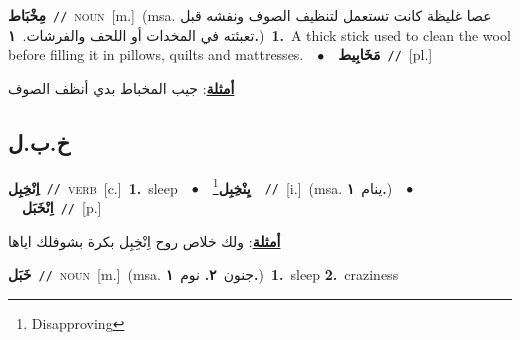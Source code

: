 \documentclass[10pt,a4paper,twoside]{article} %
\begin{document}
\begin{multicols}{2}
{{\setlength\topsep{0pt}\textbf{\foreignlanguage{arabic}{مِخْبَاط}}\ {\color{gray}\texttt{//}\color{black}}\ \textsc{noun}\ [m.]\ \color{gray}(msa. \foreignlanguage{arabic}{عصا غليظة كانت تستعمل لتنظيف الصوف ونفشه قبل تعبئته في المخدات أو اللحف والفرشات.}~\foreignlanguage{arabic}{\textbf{١.}})\color{black}\ \textbf{1.}~A thick stick used to clean the wool before filling it in pillows, quilts and mattresses.\ \ $\bullet$\ \ \setlength\topsep{0pt}\textbf{\foreignlanguage{arabic}{مَخَابِيط}}\ {\color{gray}\texttt{//}\color{black}}\ [pl.]\  \begin{flushright}\color{gray}\foreignlanguage{arabic}{\textbf{\underline{\foreignlanguage{arabic}{أمثلة}}}: جيب المخباط بدي أنظف الصوف}\end{flushright}\color{black}} \vspace{2mm}

\vspace{-3mm}
\subsection*{\color{blue}\foreignlanguage{arabic}{خ.ب.ل}\color{blue}{}} 

{\setlength\topsep{0pt}\textbf{\foreignlanguage{arabic}{اِنْخِبِل}}\ {\color{gray}\texttt{//}\color{black}}\ \textsc{verb}\ [c.]\ \textbf{1.}~sleep\ \ $\bullet$\ \ \setlength\topsep{0pt}\textbf{\foreignlanguage{arabic}{يِنْخِبِل}}\footnote{Disapproving}\ \ {\color{gray}\texttt{//}\color{black}}\ [i.]\ \color{gray}(msa. \foreignlanguage{arabic}{ينام}~\foreignlanguage{arabic}{\textbf{١.}})\color{black}\ \ $\bullet$\ \ \setlength\topsep{0pt}\textbf{\foreignlanguage{arabic}{اِنْخَبَل}}\ {\color{gray}\texttt{//}\color{black}}\ [p.]\  \begin{flushright}\color{gray}\foreignlanguage{arabic}{\textbf{\underline{\foreignlanguage{arabic}{أمثلة}}}: ولك خلاص روح اِنْخِبِل بكرة بشوفلك اياها}\end{flushright}\color{black}} \vspace{2mm}

{\setlength\topsep{0pt}\textbf{\foreignlanguage{arabic}{خَبَل}}\ {\color{gray}\texttt{//}\color{black}}\ \textsc{noun}\ [m.]\ \color{gray}(msa. \foreignlanguage{arabic}{جنون}~\foreignlanguage{arabic}{\textbf{٢.}}  \foreignlanguage{arabic}{نوم}~\foreignlanguage{arabic}{\textbf{١.}})\color{black}\ \textbf{1.}~sleep  \textbf{2.}~craziness\ 

}}
\end{multicols}
\end{document}
